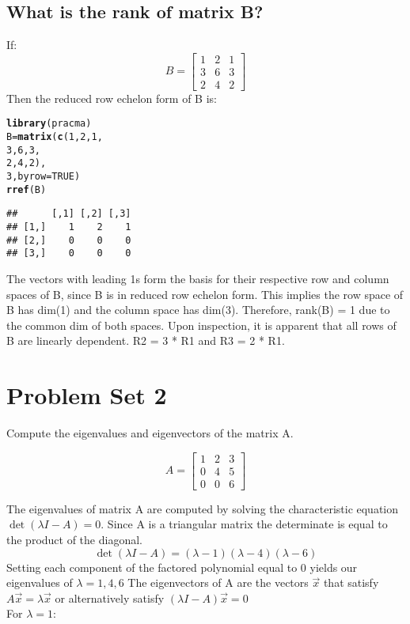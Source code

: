 \documentclass{article}\usepackage[]{graphicx}\usepackage[]{xcolor}
\makeatletter
\newcommand{\hlnum}[1]{\textcolor[rgb]{0.686,0.059,0.569}{#1}}%
\newcommand{\hlstd}[1]{\textcolor[rgb]{0.345,0.345,0.345}{#1}}%
\newcommand{\hlkwb}[1]{\textcolor[rgb]{0.69,0.353,0.396}{#1}}%
\newcommand{\hlkwc}[1]{\textcolor[rgb]{0.333,0.667,0.333}{#1}}%
\newcommand{\hlkwd}[1]{\textcolor[rgb]{0.737,0.353,0.396}{\textbf{#1}}}%
\newenvironment{kframe}{%
 \def\at@end@of@kframe{}%
 \ifinner\ifhmode%
  \def\at@end@of@kframe{\end{minipage}}%
  \begin{minipage}{\columnwidth}%
 \fi\fi%
 \def\FrameCommand##1{\hskip\@totalleftmargin \hskip-\fboxsep
 \colorbox{shadecolor}{##1}\hskip-\fboxsep
     \hskip-\linewidth \hskip-\@totalleftmargin \hskip\columnwidth}%
 \MakeFramed {\advance\hsize-\width
   \@totalleftmargin\z@ \linewidth\hsize
   \@setminipage}}%
 {\par\unskip\endMakeFramed%
 \at@end@of@kframe}
\newenvironment{knitrout}{}{} %
\makeatother
\begin{document}
\subsection{What is the rank of matrix B?}
If:
\[ B =
\left[ 
\begin{array}{ccc}
1 & 2 & 1\\
3 & 6 & 3\\
2 & 4 & 2
\end{array} 
\right] 
\]
Then the reduced row echelon form of B is:
\begin{knitrout}
\color{fgcolor}\begin{kframe}
\begin{alltt}
\hlkwd{library}\hlstd{(pracma)}
\hlstd{B} \hlkwb{=} \hlkwd{matrix}\hlstd{(}\hlkwd{c}\hlstd{(}\hlnum{1}\hlstd{,}\hlnum{2}\hlstd{,}\hlnum{1}\hlstd{,}
             \hlnum{3}\hlstd{,}\hlnum{6}\hlstd{,}\hlnum{3}\hlstd{,}
             \hlnum{2}\hlstd{,}\hlnum{4}\hlstd{,}\hlnum{2}\hlstd{),}
             \hlnum{3}\hlstd{,} \hlkwc{byrow}\hlstd{=}\hlnum{TRUE}\hlstd{)}
\hlkwd{rref}\hlstd{(B)}
\end{alltt}
\begin{verbatim}
##      [,1] [,2] [,3]
## [1,]    1    2    1
## [2,]    0    0    0
## [3,]    0    0    0
\end{verbatim}
\end{kframe}
\end{knitrout}
The vectors with leading 1s form the basis for their respective row and column spaces of B, since B is in reduced row echelon form. This implies the row space of B has dim(1) and the column space has dim(3). Therefore, rank(B) = 1 due to the common dim of both spaces. Upon inspection, it is apparent that all rows of B are linearly dependent. R2 = 3 * R1 and R3 = 2 * R1.


\section{Problem Set 2}
Compute the eigenvalues and eigenvectors of the matrix A.

\[ A =
\left[ 
\begin{array}{ccc}
1 & 2 & 3\\
0 & 4 & 5\\
0 & 0 & 6
\end{array} 
\right] 
\]

\noindent The eigenvalues of matrix A are computed by solving the characteristic equation $\det(\lambda I - A) = 0$.
Since A is a triangular matrix the determinate is equal to the product of the diagonal.
\[\det(\lambda I - A) = (\lambda - 1)(\lambda - 4)(\lambda - 6) \]
Setting each component of the factored polynomial equal to 0 yields our eigenvalues of $\lambda = 1, 4, 6$ 
\bigbreak
\noindent The eigenvectors of A are the vectors $\vec{x}$ that satisfy $A\vec{x} = \lambda\vec{x}$ or alternatively satisfy $(\lambda I - A)\vec{x} = 0$
\\For $\lambda = 1$:
\end{document}
